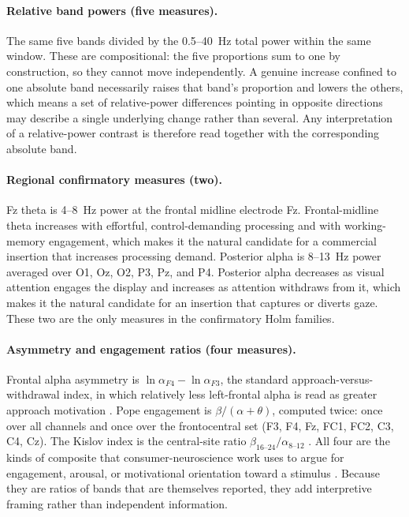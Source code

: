 \documentclass[english]{article}
\begin{document}
\paragraph{Relative band powers (five measures).}
The same five bands divided by the 0.5--40~Hz total power within the same window. These are compositional: the five proportions sum to one by construction, so they cannot move independently. A genuine increase confined to one absolute band necessarily raises that band's proportion and lowers the others, which means a set of relative-power differences pointing in opposite directions may describe a single underlying change rather than several. Any interpretation of a relative-power contrast is therefore read together with the corresponding absolute band.

\paragraph{Regional confirmatory measures (two).}
Fz theta is 4--8~Hz power at the frontal midline electrode Fz. Frontal-midline theta increases with effortful, control-demanding processing and with working-memory engagement, which makes it the natural candidate for a commercial insertion that increases processing demand. Posterior alpha is 8--13~Hz power averaged over O1, Oz, O2, P3, Pz, and P4. Posterior alpha decreases as visual attention engages the display and increases as attention withdraws from it, which makes it the natural candidate for an insertion that captures or diverts gaze. These two are the only measures in the confirmatory Holm families.

\paragraph{Asymmetry and engagement ratios (four measures).}
Frontal alpha asymmetry is \(\ln\alpha_{F4}-\ln\alpha_{F3}\), the standard approach-versus-withdrawal index, in which relatively less left-frontal alpha is read as greater approach motivation \cite{allen2004asymmetry,ohme2010application}. Pope engagement is \(\beta/(\alpha+\theta)\), computed twice: once over all channels and once over the frontocentral set (F3, F4, Fz, FC1, FC2, C3, C4, Cz). The Kislov index is the central-site ratio \(\beta_{16\text{--}24}/\alpha_{8\text{--}12}\) \cite{kislov2023central}. All four are the kinds of composite that consumer-neuroscience work uses to argue for engagement, arousal, or motivational orientation toward a stimulus \cite{vecchiato2011spectral,boksem2015brain}. Because they are ratios of bands that are themselves reported, they add interpretive framing rather than independent information.
\end{document}

